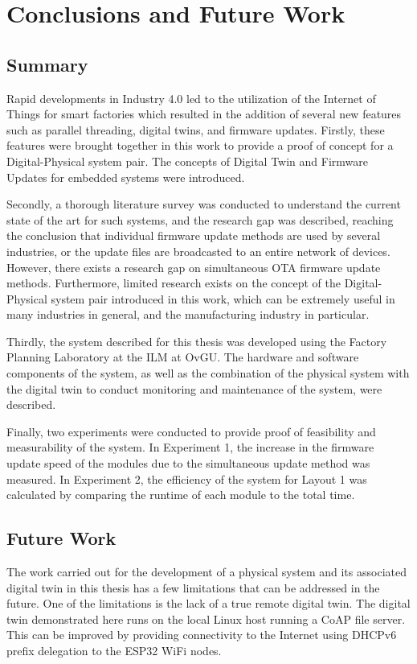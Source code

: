 \chapter{Conclusions and Future Work}
\label{ch:conclusions}

\section{Summary}
\label{sec:summary}
Rapid developments in Industry 4.0 led to the utilization of the Internet of Things for smart factories which resulted in the addition of several new features such as parallel threading, digital twins, and firmware updates. Firstly, these features were brought together in this work to provide a proof of concept for a Digital-Physical system pair. The concepts of Digital Twin and Firmware Updates for embedded systems were introduced.

Secondly, a thorough literature survey was conducted to understand the current state of the art for such systems, and the research gap was described, reaching the conclusion that individual firmware update methods are used by several industries, or the update files are broadcasted to an entire network of devices. However, there exists a research gap on simultaneous \acrshort{OTA} firmware update methods. Furthermore, limited research exists on the concept of the Digital-Physical system pair introduced in this work, which can be extremely useful in many industries in general, and the manufacturing industry in particular.

Thirdly, the system described for this thesis was developed using the Factory Planning Laboratory at the \acrlong{ILM} at OvGU. The hardware and software components of the system, as well as the combination of the physical system with the digital twin to conduct monitoring and maintenance of the system, were described.

Finally, two experiments were conducted to provide proof of feasibility and measurability of the system. In Experiment 1, the increase in the firmware update speed of the modules due to the simultaneous update method was measured. In Experiment 2, the efficiency of the system for Layout 1 was calculated by comparing the runtime of each module to the total time. %

\section{Future Work}
\label{sec:futurework}
The work carried out for the development of a physical system and its associated digital twin in this thesis has a few limitations that can be addressed in the future. One of the limitations is the lack of a true remote digital twin. The digital twin demonstrated here runs on the local Linux host running a \acrshort{CoAP} file server. This can be improved by providing connectivity to the Internet using DHCPv6 prefix delegation to the ESP32 WiFi nodes.

